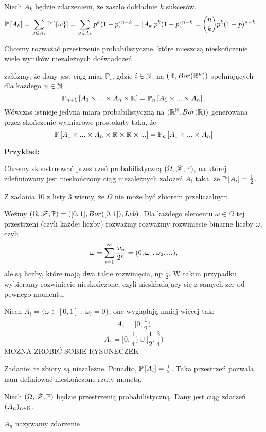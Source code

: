 Niech $A_k$ będzie zdarzeniem, że zaszło dokładnie $k$ sukcesów.
\begin{align*}
    \mathbb{P}\left[A_k\right]&=\sum\limits_{\omega\in A_k}\mathbb{P}\left[\{\omega\}\right]=\sum\limits_{\omega\in A_k}p^{k}(1-p)^{n-k}=|A_k|p^k(1-p)^{n-k}={n\choose k}p^{k}(1-p)^{n-k}
\end{align*}

Chcemy rozważać przestrzenie probabilistyczne, które mieszczą nieskończenie wiele wyników niezależnych doświadczeń.

 załóżmy, że dany jest ciąg miar $\mathbb{P}_i$, gdzie $i\in\mathbb{N}$. na $(\mathbb{R}, Bor(\mathbb{R}^n))$ spełniających dla każdego $n\in\mathbb{N}$
$$\mathbb{P}_{n+1}\left[A_1\times...\times A_n\times\mathbb{R}\right]= \mathbb{P}_n\left[A_1\times...\times A_n\right].$$
Wówczas istnieje jedyna miara probabilistyczną na $(\mathbb{R}^{\mathbb{N}},Bor(\mathbb{R}))$ generowana przez skończenie wymiarowe prostokąty taka, że
$$\mathbb{P}\left[{A_1\times...\times A_n\times\mathbb{R}\times\mathbb{R}\times...}\right]=\mathbb{P}_n\left[{A_1\times...\times A_n}\right]$$

\textbf{Przykład:} 

Chcemy skonstruować przestrzeń probabilistyczną $(\Omega,\mathcal{F},\mathbb{P})$, na której zdefiniowany jest nieskończony ciąg niezależnych założeń $A_i$ taka, że $\mathbb{P}\left[A_i\right]=\frac12$.

Z zadania 10 z listy 3 wiemy, że $\Omega$ nie może być zbiorem przeliczalnym.

Weźmy $(\Omega,\mathcal{F},\mathbb{P})=([0,1],Bor([0,1]),Leb)$. Dla każdego elementu $\omega\in\Omega$ tej przestrzeni (czyli każdej liczby) rozważmy rozważmy rozwinięcie binarne liczby $\omega$, czyli
$$\omega=\sum\limits_{i=1}^\infty{\omega_n\over2^n}=(0,\omega_1,\omega_2,...),$$
ale są liczby, które mają dwa takie rozwinięcia, np $\frac12$. W takim przypadku wybieramy rozwinięcie nieskończone, czyli nieskładający się z samych zer od pewnego momentu.

Niech $A_i=\{\omega\in[0,1]\;:\;\omega_i=0\}$, one wyglądają mniej więcej tak:
$$A_1=[0,\frac12)$$
$$A_1=[0,\frac14)\cup[\frac12,\frac34)$$
{\large\color{red}MOŻNA ZROBIĆ SOBIE RYSUNECZEK}

Zadanie: te zbiory są niezależne. Ponadto, $\mathbb{P}\left[A_i\right]=\frac12$. Taka przestrzeń pozwala nam definiować nieskończone rzuty monetą.
\medskip

Niech $(\Omega,\mathcal{F},\mathbb{P})$ będzie przestrzenią probabilistyczną. Dany jest ciąg zdarzeń $(A_n)_{n\in\mathbb{N}}$. 

\indent \point {} $A_n$ nazywamy zdarzenie 

